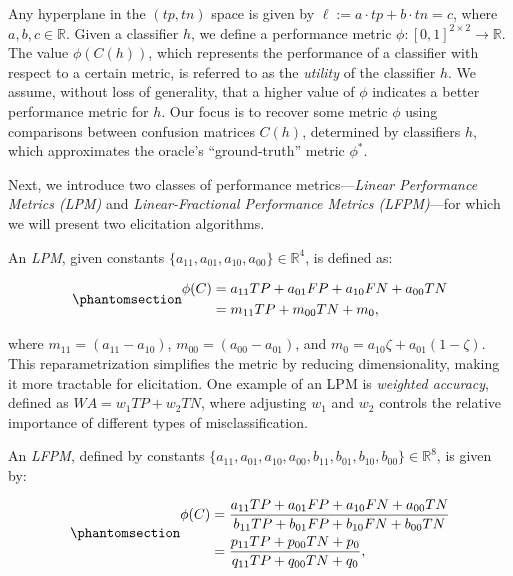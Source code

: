 \documentclass[
  letterpaper,
  numbers=noenddot,
  DIV=11]{scrreprt}
\theoremstyle{definition}
\theoremstyle{plain}
\theoremstyle{plain}
\theoremstyle{remark}
\begin{document}
Any hyperplane in the \((tp, tn)\) space is given by
\(\ell := a \cdot tp + b \cdot tn = c\), where
\(a, b, c \in \mathbb{R}\). Given a classifier \(h\), we define a
performance metric
\(\phi : [0, 1]^{2 \times 2} \rightarrow \mathbb{R}\). The value
\(\phi(C(h))\), which represents the performance of a classifier with
respect to a certain metric, is referred to as the \emph{utility} of the
classifier \(h\). We assume, without loss of generality, that a higher
value of \(\phi\) indicates a better performance metric for \(h\). Our
focus is to recover some metric \(\phi\) using comparisons between
confusion matrices \(C(h)\), determined by classifiers \(h\), which
approximates the oracle's ``ground-truth'' metric \(\phi^*\).

Next, we introduce two classes of performance metrics---\emph{Linear
Performance Metrics (LPM)} and \emph{Linear-Fractional Performance
Metrics (LFPM)}---for which we will present two elicitation algorithms.

An \emph{LPM}, given constants
\(\{a_{11}, a_{01}, a_{10}, a_{00}\} \in \mathbb{R}^{4}\), is defined
as:

\begin{equation}\phantomsection\label{eq-eqlpm}{\begin{aligned}
\phi(C) &= a_{11} TP + a_{01} FP + a_{10} FN + a_{00} TN\\
&= m_{11} TP + m_{00} TN + m_{0},
\end{aligned}}\end{equation}

where \(m_{11} = (a_{11} - a_{10})\), \(m_{00} = (a_{00} - a_{01})\),
and \(m_{0} = a_{10} \zeta + a_{01} (1 - \zeta)\). This
reparametrization simplifies the metric by reducing dimensionality,
making it more tractable for elicitation. One example of an LPM is
\emph{weighted accuracy}, defined as \(WA = w_1TP + w_2TN\), where
adjusting \(w_1\) and \(w_2\) controls the relative importance of
different types of misclassification.

An \emph{LFPM}, defined by constants
\(\{a_{11}, a_{01}, a_{10}, a_{00}, b_{11}, b_{01}, b_{10}, b_{00}\} \in \mathbb{R}^{8}\),
is given by:

\begin{equation}\phantomsection\label{eq-eqlfpm}{\begin{aligned}
\phi(C) &= \frac{a_{11} TP + a_{01} FP + a_{10} FN + a_{00} TN}{b_{11} TP + b_{01} FP + b_{10} FN + b_{00} TN}\\
&= \frac{p_{11} TP + p_{00} TN + p_{0}}{q_{11} TP + q_{00} TN + q_{0}},
\end{aligned}}\end{equation}
\end{document}
